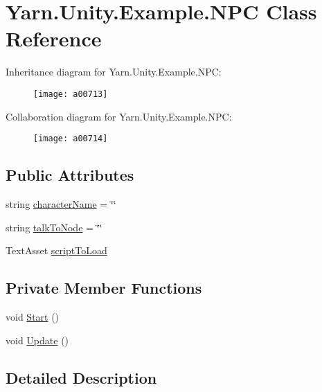 \hypertarget{a00132}{\section{Yarn.\-Unity.\-Example.\-N\-P\-C Class Reference}
\label{a00132}
}


Inheritance diagram for Yarn.\-Unity.\-Example.\-N\-P\-C\-:
\nopagebreak
\begin{figure}[H]
\begin{center}
\leavevmode
\texttt{[image: a00713]}
\end{center}
\end{figure}


Collaboration diagram for Yarn.\-Unity.\-Example.\-N\-P\-C\-:
\nopagebreak
\begin{figure}[H]
\begin{center}
\leavevmode
\texttt{[image: a00714]}
\end{center}
\end{figure}
\subsection*{Public Attributes}
\begin{DoxyCompactItemize}
\item 
string \hyperlink{a00132_a418ea7095bd8201559ed392f07905ca3}{character\-Name} = \char`\"{}\char`\"{}
\item 
string \hyperlink{a00132_a64f4f1fb66b2046a674e3ebf3b9fdb56}{talk\-To\-Node} = \char`\"{}\char`\"{}
\item 
Text\-Asset \hyperlink{a00132_a63145fb6ddf357e604d71bac04ca8a60}{script\-To\-Load}
\end{DoxyCompactItemize}
\subsection*{Private Member Functions}
\begin{DoxyCompactItemize}
\item 
void \hyperlink{a00132_a0bf37075312ea87c2e329cc363a328a6}{Start} ()
\item 
void \hyperlink{a00132_ab1bea5afabd1c2e1e991063b1579d062}{Update} ()
\end{DoxyCompactItemize}


\subsection{Detailed Description}


